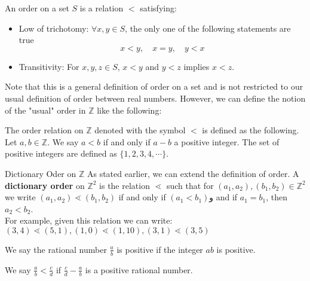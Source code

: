 \begin{defbox}
	An order on a set $ S $ is a relation $ < $ satisfying:
	\begin{itemize}
		\item Low of trichotomy: $ \forall x,y \in S $, the only one of the following statements are true
		\[ x<y, \quad x=y, \quad y<x \]
		
		\item Transitivity: For $ x,y,z \in S $, $ x<y $ and $ y<z $ implies $ x<z $.
	\end{itemize}
\end{defbox}


Note that this is a general definition of order on a set and is not restricted to our usual definition of order between real numbers. However, we can define the notion of the "usual" order in $ \mathbb{Z} $ like the following:

\begin{defbox}
	The order relation on $ \mathbb{Z} $ denoted with the symbol $ < $ is defined as the following. Let $ a,b \in \mathbb{Z} $. We say $ a<b $ if and only if $ a-b $ a positive integer. The set of positive integers are defined as $ \{ 1,2,3,4,\cdots \} $.
\end{defbox}

\begin{example}{Dictionary Oder on $\mathbb{Z}$}
	As stated earlier, we can extend the definition of order. A \textbf{dictionary order} on $\mathbb{Z}^2$ is the relation $\lessdot$ such that for $(a_1, a_2), (b_1,b_2) \in \mathbb{Z}^2$ we write $(a_1, a_2) \lessdot (b_1, b_2)$ if and only if  $(a_1 < b_1) $و and if $a_1 = b_1$, then $ a_2 < b_2 $. \\
	For example, given this relation we can write:
	$(3,4) \lessdot (5,1), (1,0) \lessdot (1,10), (3,1) \lessdot (3,5)$
\end{example}



\begin{defbox}
	We say the rational number $ \frac{a}{b} $ is positive if the integer $ ab $ is positive. 
\end{defbox}

\begin{defbox}
	We say $ \frac{a}{b} < \frac{c}{d}$ if $ \frac{c}{d} - \frac{a}{b} $ is a positive rational number.
\end{defbox}

